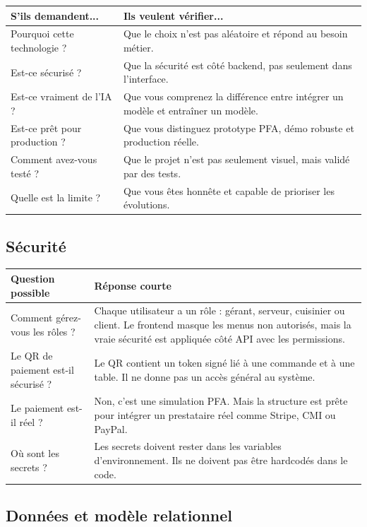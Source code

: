 \documentclass[10pt,a4paper]{article}
\begin{document}
\begin{tabularx}{\textwidth}{p{4.4cm}Y}
\toprule
\textbf{S'ils demandent...} & \textbf{Ils veulent vérifier...} \\
\midrule
Pourquoi cette technologie ? & Que le choix n'est pas aléatoire et répond au besoin métier. \\
Est-ce sécurisé ? & Que la sécurité est côté backend, pas seulement dans l'interface. \\
Est-ce vraiment de l'IA ? & Que vous comprenez la différence entre intégrer un modèle et entraîner un modèle. \\
Est-ce prêt pour production ? & Que vous distinguez prototype PFA, démo robuste et production réelle. \\
Comment avez-vous testé ? & Que le projet n'est pas seulement visuel, mais validé par des tests. \\
Quelle est la limite ? & Que vous êtes honnête et capable de prioriser les évolutions. \\
\bottomrule
\end{tabularx}

\subsection{Sécurité}

\begin{tabularx}{\textwidth}{p{5cm}Y}
\toprule
\textbf{Question possible} & \textbf{Réponse courte} \\
\midrule
Comment gérez-vous les rôles ? & Chaque utilisateur a un rôle : gérant, serveur, cuisinier ou client. Le frontend masque les menus non autorisés, mais la vraie sécurité est appliquée côté API avec les permissions. \\
Le QR de paiement est-il sécurisé ? & Le QR contient un token signé lié à une commande et à une table. Il ne donne pas un accès général au système. \\
Le paiement est-il réel ? & Non, c'est une simulation PFA. Mais la structure est prête pour intégrer un prestataire réel comme Stripe, CMI ou PayPal. \\
Où sont les secrets ? & Les secrets doivent rester dans les variables d'environnement. Ils ne doivent pas être hardcodés dans le code. \\
\bottomrule
\end{tabularx}

\subsection{Données et modèle relationnel}
\end{document}
